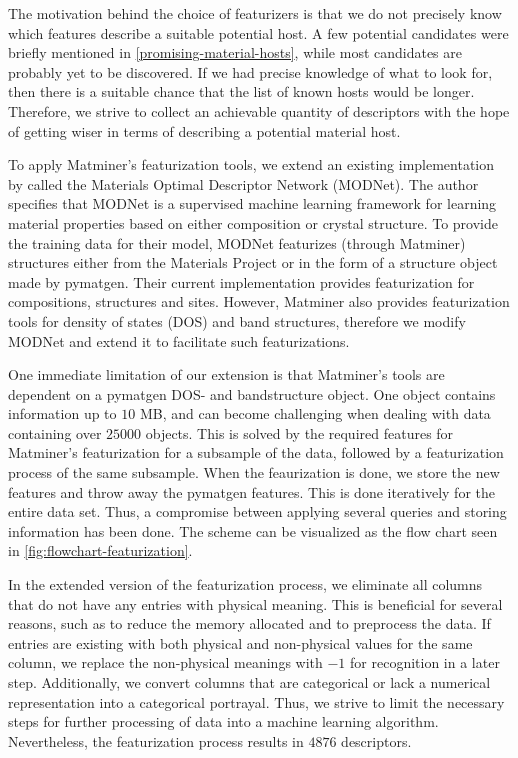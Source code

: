 The motivation behind the choice of featurizers is that we do not precisely know which features describe a suitable potential host. A few potential candidates were briefly mentioned in \autoref{promising-material-hosts}, while most candidates are probably yet to be discovered. If we had precise knowledge of what to look for, then there is a suitable chance that the list of known hosts would be longer. Therefore, we strive to collect an achievable quantity of descriptors with the hope of getting wiser in terms of describing a potential material host.

To apply Matminer's featurization tools, we extend an existing implementation by \citeauthor{Breuck2021} \cite{Breuck2021} called the Materials Optimal Descriptor Network (MODNet). The author \citeauthor{Breuck2021} specifies that MODNet is a supervised machine learning framework for learning material properties based on either composition or crystal structure. To provide the training data for their model, MODNet featurizes (through Matminer) structures either from the Materials Project or in the form of a structure object made by pymatgen. Their current implementation provides featurization for compositions, structures and sites. However, Matminer also provides featurization tools for density of states (DOS) and band structures, therefore we modify MODNet and extend it to facilitate such featurizations.



\noindent One immediate limitation of our extension is that Matminer's tools are dependent on a pymatgen DOS- and bandstructure object. One object contains information up to $10$ MB, and can become challenging when dealing with data containing over $25000$ objects. This is solved by the required features for Matminer's featurization for a subsample of the data, followed by a featurization process of the same subsample. When the feaurization is done, we store the new features and throw away the pymatgen features. This is done iteratively for the entire data set. Thus, a compromise between applying several queries and storing information has been done. The scheme can be visualized as the flow chart seen in \autoref{fig:flowchart-featurization}.

In the extended version of the featurization process, we eliminate all columns that do not have any entries with physical meaning. This is beneficial for several reasons, such as to reduce the memory allocated and to preprocess the data. If entries are existing with both physical and non-physical values for the same column, we replace the non-physical meanings with $-1$ for recognition in a later step. Additionally, we convert columns that are categorical or lack a numerical representation into a categorical portrayal. Thus, we strive to limit the necessary steps for further processing of data into a machine learning algorithm. Nevertheless, the featurization process results in $4876$ descriptors.

